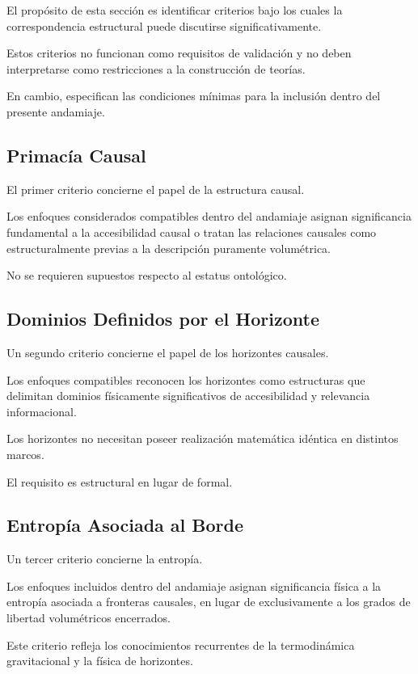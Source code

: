 \documentclass[12pt,a4paper]{article}
\begin{document}
El propósito de esta sección es identificar criterios bajo los cuales la correspondencia estructural puede discutirse significativamente.

Estos criterios no funcionan como requisitos de validación y no deben interpretarse como restricciones a la construcción de teorías.

En cambio, especifican las condiciones mínimas para la inclusión dentro del presente andamiaje.

\subsection{Primacía Causal}

El primer criterio concierne el papel de la estructura causal.

Los enfoques considerados compatibles dentro del andamiaje asignan significancia fundamental a la accesibilidad causal o tratan las relaciones causales como estructuralmente previas a la descripción puramente volumétrica.

No se requieren supuestos respecto al estatus ontológico.

\subsection{Dominios Definidos por el Horizonte}

Un segundo criterio concierne el papel de los horizontes causales.

Los enfoques compatibles reconocen los horizontes como estructuras que delimitan dominios físicamente significativos de accesibilidad y relevancia informacional.

Los horizontes no necesitan poseer realización matemática idéntica en distintos marcos.

El requisito es estructural en lugar de formal.

\subsection{Entropía Asociada al Borde}

Un tercer criterio concierne la entropía.

Los enfoques incluidos dentro del andamiaje asignan significancia física a la entropía asociada a fronteras causales, en lugar de exclusivamente a los grados de libertad volumétricos encerrados.

Este criterio refleja los conocimientos recurrentes de la termodinámica gravitacional y la física de horizontes.
\end{document}
